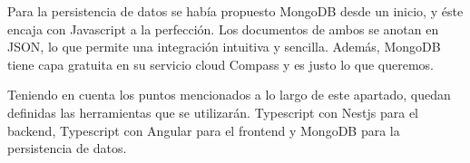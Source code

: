 \par Para la persistencia de datos se había propuesto MongoDB desde un inicio, y éste encaja con Javascript a la perfección. Los documentos de ambos se anotan en JSON, lo que permite una integración intuitiva y sencilla. Además, MongoDB tiene capa gratuita en su servicio cloud Compass y es justo lo que queremos. 
\par Teniendo en cuenta los puntos mencionados a lo largo de este apartado, quedan definidas las herramientas que se utilizarán.
Typescript con Nestjs para el backend, Typescript con Angular para el frontend y MongoDB para la persistencia de datos. 
\clearpage
